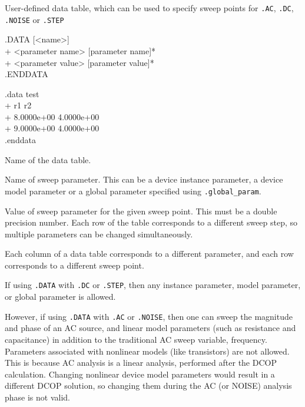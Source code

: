 


User-defined data table, which can be used to specify sweep points for \texttt{.AC}, \texttt{.DC}, \texttt{.NOISE} or \texttt{.STEP}

\begin{Command}

\format
.DATA [<name>] \\
+ <parameter name> [parameter name]* \\
+ <parameter value> [parameter value]* \\
.ENDDATA

\examples
.data test \\
+ r1   r2 \\
+ 8.0000e+00  4.0000e+00 \\
+ 9.0000e+00  4.0000e+00 \\
.enddata

\arguments

\begin{Arguments}
Name of the data table.

Name of sweep parameter.  This can be a device instance parameter, a device model parameter or a global parameter specified using \texttt{.global\_param}.

Value of sweep parameter for the given sweep point.  This must be a double precision number.  Each row of the table corresponds to a different sweep step, so multiple parameters can be changed simultaneously.

\end{Arguments}

\comments

Each column of a data table corresponds to a different parameter, and each row corresponds to a different sweep point.

If using \texttt{.DATA} with \texttt{.DC} or \texttt{.STEP}, then any instance parameter, model parameter, or global parameter is allowed.

However, if using \texttt{.DATA} with \texttt{.AC} or \texttt{.NOISE}, then one can sweep the magnitude and phase of an AC source, and linear model parameters (such as resistance and capacitance) in addition to the traditional AC sweep variable, frequency.  Parameters associated with nonlinear models (like transistors) are not allowed.  This is because AC analysis is a linear analysis, performed after the DCOP calculation.  Changing nonlinear device model parameters would result in a different DCOP solution, so changing them during the AC (or NOISE) analysis phase is not valid.


\end{Command}
